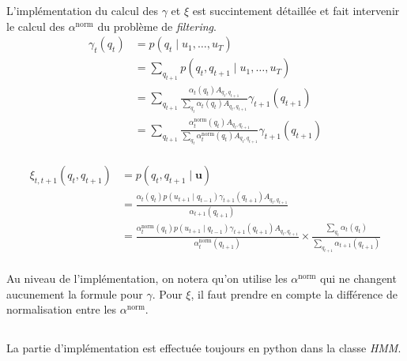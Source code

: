\documentclass[12pt,a4paper,onecolumn]{article}
\begin{document}
L'implémentation du calcul des \(\gamma\) et \(\xi\) est succintement détaillée et fait intervenir le calcul des \(\alpha^{\text{norm}}\) du problème de \textit{filtering}.
\begin{equation}
	\begin{split}
		\gamma_t(q_t) &= p(q_t \mid u_1, \dots, u_T)\\
		&= \sum_{q_{t+1}}p(q_t, q_{t+1} \mid u_1, \dots, u_T)\\
		&= \sum_{q_{t+1}} \frac{\alpha_t(q_t)A_{q_t, q_{t+1}}}{\sum_{q_t}\alpha_t(q_t)A_{q_t, q_{t+1}}}\gamma_{t+1}(q_{t+1})\\
		&= \sum_{q_{t+1}} \frac{{\alpha_t^{\text{norm}}}(q_t)A_{q_t, q_{t+1}}}{\sum_{q_t}{\alpha_t^{\text{norm}}}(q_t)A_{q_t, q_{t+1}}}\gamma_{t+1}(q_{t+1})\\
	\end{split}
\end{equation}

\begin{equation}
	\begin{split}
		\xi_{t,t+1}(q_t, q_{t+1}) &= p(q_t, q_{t+1} \mid \bm{u})\\
		&= \frac{\alpha_t(q_t)p(u_{t+1} \mid q_{t-1})\gamma_{t+1}(q_{t+1})A_{q_t, q_{t+1}}}{\alpha_{t+1}(q_{t+1})}\\
		&= \frac{\alpha^{\text{norm}}_t(q_t)p(u_{t+1} \mid q_{t-1})\gamma_{t+1}(q_{t+1})A_{q_t, q_{t+1}}}{\alpha^{\text{norm}}_t(q_{t+1})} \times \frac{\sum_{q_t}\alpha_t(q_t)}{\sum_{q_{t+1}}\alpha_{t+1}(q_{t+1})}\\
	\end{split}
\end{equation}

Au niveau de l'implémentation, on notera qu'on utilise les \(\alpha^{\text{norm}}\) qui ne changent aucunement la formule pour \(\gamma\). Pour \(\xi\), il faut prendre en compte la différence de normalisation entre les \(\alpha^{\text{norm}}\).


\subsection{}

La partie d'implémentation est effectuée toujours en python dans la classe \textit{HMM}.

\subsection{}
\end{document}
